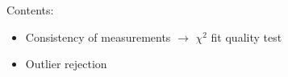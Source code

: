 %
%
%
\begin{slide}
\pagestyle{headings}
\sf 
{}
%
\Large
Contents:
\begin{itemize}
\item
Consistency of measurements $\rightarrow$
$\chi^2$ fit quality test
\item 
Outlier rejection
\end{itemize}
%
\end{slide}




